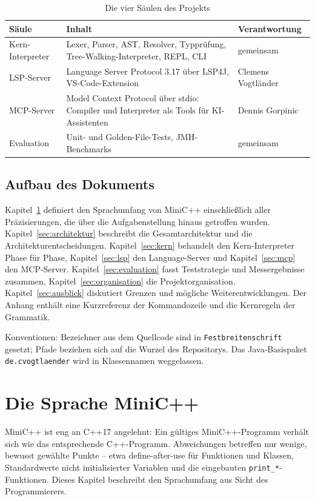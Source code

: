 \documentclass[11pt,a4paper,parskip=half,headsepline,toc=flat]{scrartcl}
\newcommand{\code}[1]{\texttt{#1}}
\newcommand{\thead}{\rowcolor{headbg}}
\newcommand{\hcell}[1]{\textbf{\color{navy}#1}}
\newenvironment{reporttable}[1][]%
  {\begin{table}[htbp]\centering\small\renewcommand{\arraystretch}{1.25}\rowcolors{2}{white}{zebra}}%
  {\end{table}}
\begin{document}
\begin{reporttable}
\begin{tabular}{L{0.18}L{0.52}L{0.22}}
\thead \hcell{Säule} & \hcell{Inhalt} & \hcell{Verantwortung} \\ \midrule
Kern-Interpreter & Lexer, Parser, AST, Resolver, Typprüfung, Tree-Walking-Interpreter, REPL, CLI & gemeinsam \\
LSP-Server & Language Server Protocol 3.17 über LSP4J, VS-Code-Extension & Clemens Vogtländer \\
MCP-Server & Model Context Protocol über stdio: Compiler und Interpreter als Tools für KI-Assistenten & Dennis Gorpinic \\
Evaluation & Unit- und Golden-File-Tests, JMH-Benchmarks & gemeinsam \\ \bottomrule
\end{tabular}
\caption{Die vier Säulen des Projekts}
\end{reporttable}

\subsection{Aufbau des Dokuments}
Kapitel~\ref{sec:sprache} definiert den Sprachumfang von MiniC++ einschließlich aller Präzisierungen, die über die
Aufgabenstellung hinaus getroffen wurden. Kapitel~\ref{sec:architektur} beschreibt die Gesamtarchitektur und die
Architekturentscheidungen. Kapitel~\ref{sec:kern} behandelt den Kern-Interpreter Phase für Phase,
Kapitel~\ref{sec:lsp} den Language-Server und Kapitel~\ref{sec:mcp} den MCP-Server.
Kapitel~\ref{sec:evaluation} fasst Teststrategie und Messergebnisse zusammen, Kapitel~\ref{sec:organisation} die
Projektorganisation. Kapitel~\ref{sec:ausblick} diskutiert Grenzen und mögliche Weiterentwicklungen. Der Anhang
enthält eine Kurzreferenz der Kommandozeile und die Kernregeln der Grammatik.

Konventionen: Bezeichner aus dem Quellcode sind in \code{Festbreitenschrift} gesetzt; Pfade beziehen sich auf die
Wurzel des Repositorys. Das Java-Basispaket \code{de.cvogtlaender} wird in Klassennamen weggelassen.

\section{Die Sprache MiniC++}\label{sec:sprache}
MiniC++ ist eng an C++17 angelehnt: Ein gültiges MiniC++-Programm verhält sich wie das entsprechende C++-Programm.
Abweichungen betreffen nur wenige, bewusst gewählte Punkte -- etwa define-after-use für Funktionen und Klassen,
Standardwerte nicht initialisierter Variablen und die eingebauten \code{print\_*}-Funktionen. Dieses Kapitel
beschreibt den Sprachumfang aus Sicht des Programmierers.
\end{document}
